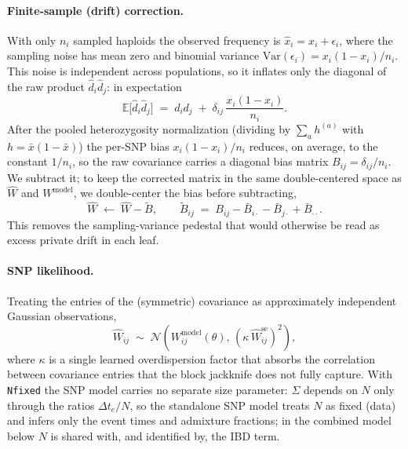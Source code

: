 \documentclass[12pt]{article}
\theoremstyle{definition}
\theoremstyle{definition}
\theoremstyle{lemma}
\theoremstyle{remark}
\theoremstyle{definition}
\begin{document}
\paragraph{Finite-sample (drift) correction.}
With only $n_i$ sampled haploids the observed frequency is
$\hat x_i = x_i + \epsilon_i$, where the sampling noise has mean zero and
binomial variance $\mathrm{Var}(\epsilon_i)=x_i(1-x_i)/n_i$. This noise is
independent across populations, so it inflates only the diagonal of the raw
product $\hat d_i\hat d_j$: in expectation
\[
  \mathbb{E}\big[\hat d_i\hat d_j\big]
  \;=\; d_id_j \;+\; \delta_{ij}\,\frac{x_i(1-x_i)}{n_i}.
\]
After the pooled heterozygosity normalization (dividing by $\sum_a h^{(a)}$ with
$h=\bar x(1-\bar x)$) the per-SNP bias $x_i(1-x_i)/n_i$ reduces, on average, to
the constant $1/n_i$, so the raw covariance carries a diagonal bias matrix
$B_{ij}=\delta_{ij}/n_i$. We subtract it; to keep the corrected matrix in the
same double-centered space as $\hat W$ and $W^{\text{model}}$, we double-center
the bias before subtracting,
\[
  \hat W \;\leftarrow\; \hat W - \tilde B,
  \qquad
  \tilde B_{ij} \;=\; B_{ij} - \bar B_{i\cdot} - \bar B_{j\cdot} + \bar B_{\cdot\cdot}.
\]
This removes the sampling-variance pedestal that would otherwise be read as
excess private drift in each leaf.

\paragraph{SNP likelihood.}
Treating the entries of the (symmetric) covariance as approximately independent
Gaussian observations,
\[
  \hat W_{ij} \;\sim\; \mathcal{N}\!\left(W^{\text{model}}_{ij}(\theta),\,
  (\kappa\,\hat W^{\text{se}}_{ij})^2\right),
\]
where $\kappa$ is a single learned overdispersion factor that absorbs the
correlation between covariance entries that the block jackknife does not fully
capture. With \texttt{Nfixed} the SNP model carries no separate size parameter:
$\Sigma$ depends on $N$ only through the ratios $\Delta t_e/N$, so the standalone
SNP model treats $N$ as fixed (data) and infers only the event times and admixture
fractions; in the combined model below $N$ is shared with, and identified by, the
IBD term.
\end{document}
